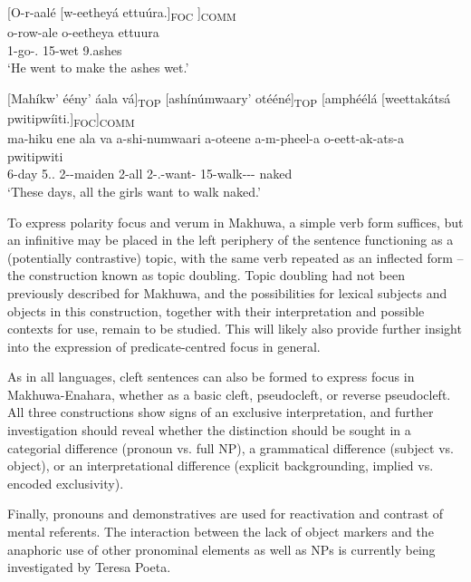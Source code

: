 \documentclass[output=paper]{langscibook}
\begin{document}
\z

\ea
{}[O-r-aalé  [w-eetheyá  ettuúra.]\textsubscript{FOC} ]\textsubscript{COMM}\\
\gll
o-row-ale  o-eetheya  ettuura\\
1\SM{}-go-\PFV{}.\CJ{}  15-wet  9.ashes\\
\glt
‘He went to make the ashes wet.’\\


\z

\ea
\label{bkm:Ref129852498}
[Mahíkw’ éény’ áala vá]\textsubscript{TOP} [ashínúmwaary’ otééné]\textsubscript{TOP} [amphéélá [weettakátsá pwitipwíiti.]\textsubscript{FOC}]\textsubscript{COMM}\\
\gll
ma-hiku  ene  ala  va  a-shi-numwaari  a-oteene  a-m-pheel-a   o-eett-ak-ats-a  pwitipwiti \\
6-day  \INT{}  5.\DEM{}.\PROX{}  \PP{}  2-\DIM{}-maiden  2-all  2\SM{}-\PRS{}.\CJ{}-want-\FV{}  15-walk-\DUR{}-\PLUR{}-\FV{}  naked \\
\glt
‘These days, all the girls want to walk naked.’\\

\z

To express polarity focus and verum in Makhuwa, a simple verb form suffices, but an infinitive may be placed in the left periphery of the sentence functioning as a (potentially contrastive) topic, with the same verb repeated as an inflected form – the construction known as topic doubling. Topic doubling had not been previously described for Makhuwa, and the possibilities for lexical subjects and objects in this construction, together with their interpretation and possible contexts for use, remain to be studied. This will likely also provide further insight into the expression of predicate-centred focus in general.

As in all languages, cleft sentences can also be formed to express focus in Makhuwa-Enahara, whether as a basic cleft, pseudocleft, or reverse pseudocleft. All three constructions show signs of an exclusive interpretation, and further investigation should reveal whether the distinction should be sought in a categorial difference (pronoun vs. full NP), a grammatical difference (subject vs. object), or an interpretational difference (explicit backgrounding, implied vs. encoded exclusivity).

Finally, pronouns and demonstratives are used for reactivation and contrast of mental referents. The interaction between the lack of object markers and the anaphoric use of other pronominal elements as well as NPs is currently being investigated by Teresa Poeta.
\end{document}
